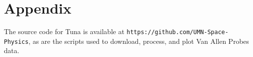 \documentclass{article}
\begin{document}

\appendix

\section{Appendix}

The source code for Tuna is available at \texttt{https://github.com/UMN-Space-Physics}, as are the scripts used to download, process, and plot Van Allen Probes data.


\end{document}
